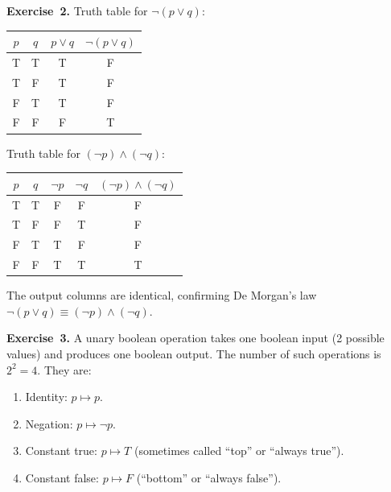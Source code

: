 \documentclass[11pt]{article}
\begin{document}
\medskip
\textbf{Exercise~2.}
Truth table for $\lnot(p \vee q)$:

\begin{center}
\begin{tabular}{cc|c|c}
\toprule
$p$ & $q$ & $p \vee q$ & $\lnot(p \vee q)$ \\
\midrule
T & T & T & F \\
T & F & T & F \\
F & T & T & F \\
F & F & F & T \\
\bottomrule
\end{tabular}
\end{center}

Truth table for $(\lnot p) \wedge (\lnot q)$:

\begin{center}
\begin{tabular}{cc|c|c|c}
\toprule
$p$ & $q$ & $\lnot p$ & $\lnot q$ & $(\lnot p) \wedge (\lnot q)$ \\
\midrule
T & T & F & F & F \\
T & F & F & T & F \\
F & T & T & F & F \\
F & F & T & T & T \\
\bottomrule
\end{tabular}
\end{center}

The output columns are identical, confirming De Morgan's law
$\lnot(p \vee q) \equiv (\lnot p) \wedge (\lnot q)$.

\medskip
\textbf{Exercise~3.}
A unary boolean operation takes one boolean input (2 possible values) and
produces one boolean output.  The number of such operations is $2^2 = 4$.
They are:
\begin{enumerate}
  \item Identity: $p \mapsto p$.
  \item Negation: $p \mapsto \lnot p$.
  \item Constant true: $p \mapsto T$ (sometimes called ``top'' or ``always true'').
  \item Constant false: $p \mapsto F$ (``bottom'' or ``always false'').
\end{enumerate}
\end{document}
